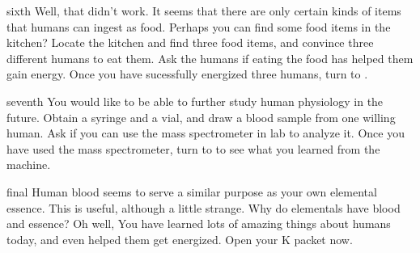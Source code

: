 \documentclass[notebook]{elementals} %
\begin{document}
\begin{page}{sixth}
 Well, that didn't work.  It seems that there are only certain kinds of items that humans can ingest as food.  Perhaps you can find some food items in the kitchen?  Locate the kitchen and find three food items, and convince three different humans to eat them.  Ask the humans if eating the food has helped them gain energy.  Once you have sucessfully energized three humans, turn to .
\end{page}

\begin{page}{seventh}
You would like to be able to further study human physiology in the future.  Obtain a syringe and a vial, and draw a blood sample from one willing human.  Ask \cGD{} if you can use the mass spectrometer in \cGD{\their} lab to analyze it.  Once you have used the mass spectrometer, turn to  to see what you learned from the machine.
\end{page}

\begin{page}{final}
Human blood seems to serve a similar purpose as your own elemental essence.  This is useful, although a little strange. Why do elementals have blood and essence? Oh well, You have learned lots of amazing things about humans today, and even helped them get energized. Open your K packet now.
\end{page}

\endnotebook
\end{document}
